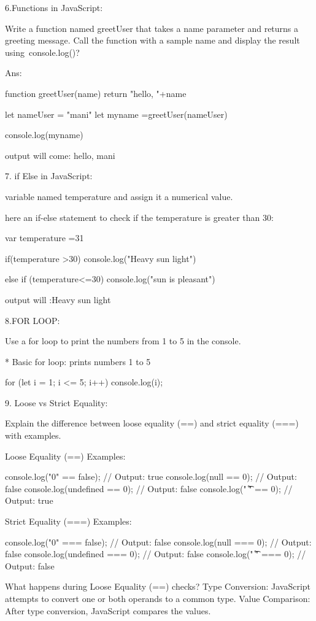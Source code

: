 6.Functions in JavaScript:

Write a function named greetUser that takes a name parameter and returns a greeting message.
Call the function with a sample name and display the result using console.log()?

Ans:
     
function greetUser(name){
     return "hello, "+name
 }
 
 let nameUser = "mani"
 let myname =greetUser(nameUser)
 
 console.log(myname)

      output will come: hello, mani

7. if Else in JavaScript:

 variable named temperature and assign it a numerical value.

here an if-else statement to check if the temperature is greater than 30:


var temperature =31

if(temperature >30)
{console.log("Heavy sun light")}

else if (temperature<=30)
{console.log("sun is pleasant")}

output will :Heavy sun light



8.FOR LOOP:

Use a for loop to print the numbers from 1 to 5 in the console.


* Basic for loop: prints numbers 1 to 5

for (let i = 1; i <= 5; i++) {
    console.log(i);
  }

 9. Loose vs Strict Equality:

Explain the difference between loose equality (==) and strict equality (===) with examples.

Loose Equality (==) Examples:

console.log("0" == false);  // Output: true
console.log(null == 0);  // Output: false
console.log(undefined == 0);  // Output: false
console.log(" \t\r\n" == 0);  // Output: true


Strict Equality (===) Examples:

console.log("0" === false);  // Output: false
console.log(null === 0);  // Output: false
console.log(undefined === 0);  // Output: false
console.log(" \t\r\n" === 0);  // Output: false


What happens during Loose Equality (==) checks?
  Type Conversion: JavaScript attempts to convert one or both operands to a common type.
  Value Comparison: After type conversion, JavaScript compares the values.

